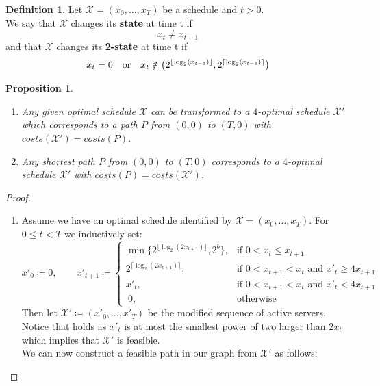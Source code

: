 \documentclass[hidelinks]{article}
\theoremstyle{plain}
\newtheorem{prop}[thm]{Proposition}
\theoremstyle{definition}
\newtheorem{defn}[thm]{Definition}
\theoremstyle{rem}
\newcommand{\mx}{\mathcal{X}}
\begin{document}
\begin{sloppypar}
\begin{defn}
Let $\mx=(x_0,\ldots,x_T)$ be a schedule and $t>0$.\\
We say that $\mx$ changes its \textbf{state} at time t if
\begin{equation*}
	x_t\neq x_{t-1}
\end{equation*}
and that $\mx$ changes its \textbf{2-state} at time t if
\begin{equation*}
	x_t=0\text{\quad or\quad}x_t\notin\bigl(2^{\lfloor \log_2(x_{t-1})\rfloor},2^{\lceil \log_2(x_{t-1})\rceil}\bigr)
\end{equation*}
\end{defn}
\begin{prop}
$ $
\begin{enumerate}
	\item\label{prop:2opt} Any given optimal schedule $\mx$ can be transformed to a $4$-optimal schedule $\mx'$ which corresponds to a path $P$ from $(0,0)$ to $(T,0)$ with $costs(\mx')=costs(P)$.
	\item Any shortest path $P$ from $(0,0)$ to $(T,0)$ corresponds to a $4$-optimal schedule $\mx'$ with $costs(P)=costs(\mx')$.
\end{enumerate}
\end{prop}
\begin{proof}
$ $
\begin{enumerate}
	\item Assume we have an optimal schedule identified by $\mx=(x_0,\ldots,x_T)$. For $0\le t<T$ we inductively set:
\begin{equation}
	x'_0\coloneqq 0,\qquad
	x'_{t+1}\coloneqq 
	\begin{cases}
		\min\bigl\{2^{\lfloor \log_2(2x_{t+1})\rfloor},2^b\bigr\}, & \text{if $0<x_t\le x_{t+1}$}\\
		2^{\lceil \log_2(2x_{t+1})\rceil}, & \text{if $0<x_{t+1}<x_t$ and $x'_{t}\ge4x_{t+1}$}\\
		x'_t, & \text{if $0<x_{t+1}<x_t$ and $x'_{t}<4x_{t+1}$}\\
		\		   0, & \text{otherwise}
	\end{cases} \label{def:chi_prime}
\end{equation}
Then let $\mx'\coloneqq(x'_0,\ldots,x'_T)$ be the modified sequence of active servers. Notice that  holds as $x'_t$ is at most the smallest power of two larger than $2x_t$ which implies that $\mx'$ is feasible.\\
We can now construct a feasible path in our graph from $\mathcal{X'}$ as follows:

\end{enumerate}
\end{proof}
\end{sloppypar}
\end{document}
